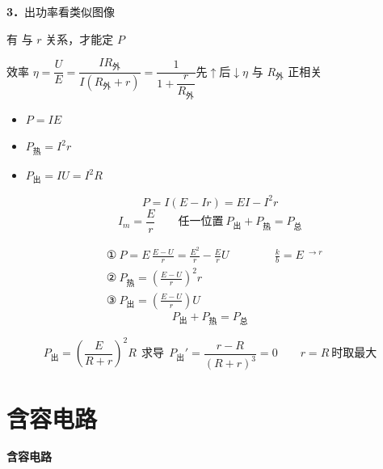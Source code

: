 \textbf{3．}出功率看类似图像


有  与 $r$ 关系，才能定 $P$

效率 $\eta=\dfrac{U}{E}=\dfrac{IR_{\text{外}}}{I(R_{\text{外}}+r)}=\dfrac{1}{1+\dfrac{r}{R_{\text{外}}}}$\quad 先$\uparrow$后$\downarrow$\quad $\eta$ 与 $R_{\text{外}}$ 正相关 %

\begin{itemize}
\item $P=IE$
\item $P_{\text{热}}=I^2r$
\item $P_{\text{出}}=IU=I^2R$
\end{itemize}


\[
P=I(E-Ir)=EI-I^2r
\]
\[
I_m=\frac{E}{r}\qquad\text{任一位置}\ P_{\text{出}}+P_{\text{热}}=P_{\text{总}}
\]


\begin{align*}
&\text{①}\ P=E\,\frac{E-U}{r}=\frac{E^2}{r}-\frac{E}{r}U\qquad\qquad \frac{k}{b}=E\ {}^{\to r}\\
&\text{②}\ P_{\text{热}}=\left(\frac{E-U}{r}\right)^{2}r\\
&\text{③}\ P_{\text{出}}=\left(\frac{E-U}{r}\right)U
\end{align*}
\[
P_{\text{出}}+P_{\text{热}}=P_{\text{总}}
\]


\[
P_{\text{出}}=\left(\frac{E}{R+r}\right)^{2}R\ \ \text{求导}\ \ P_{\text{出}}'=\frac{r-R}{(R+r)^{3}}=0\qquad r=R\ \text{时取最大}
\]


\section{含容电路}
\textbf{含容电路}

